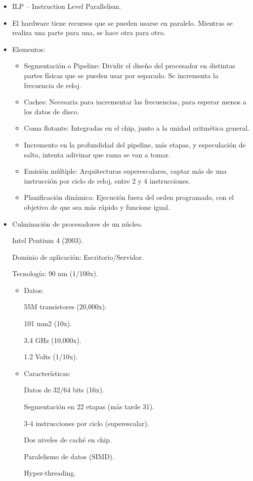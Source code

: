 \documentclass[12pt, twoside, openright]{report} %
\begin{document}
\begin{itemize}
	\item ILP -- Instruction Level Parallelism.
	\item El hardware tiene recursos que se pueden usarse en paralelo.
	      Mientras se realiza una parte para una, se hace otra para otro.
	\item Elementos:

	      \begin{itemize}

		      \item Segmentación o Pipeline: Dividir el diseño del procesador en
		            distintas partes físicas que se pueden usar por separado. Se
		            incrementa la frecuencia de reloj.
		      \item Caches: Necesaria para incrementar las frecuencias, para esperar
		            menos a los datos de disco.
		      \item Coma flotante: Integradas en el chip, junto a la unidad
		            aritmética general.
		      \item Incremento en la profundidad del pipeline, más etapas, y
		            especulación de salto, intenta adivinar que rama se van a tomar.
		      \item Emisión múltiple: Arquitecturas superescalares, captar más de
		            una instrucción por ciclo de reloj, entre 2 y 4 instrucciones.
		      \item Planificación dinámica: Ejecución fuera del orden programado,
		            con el objetivo de que sea más rápido y funcione igual.
	      \end{itemize}
	\item Culminación de procesadores de un núcleo.

	      Intel Pentium 4 (2003).

	      Dominio de aplicación: Escritorio/Servidor.

	      Tecnología: 90 nm (1/100x).
	      \begin{itemize}
		      \item Datos:

		            55M transistores (20,000x).

		            101 mm2 (10x).

		            3.4 GHz (10,000x).

		            1.2 Volts (1/10x).

		      \item Características:

		            Datos de 32/64 bits (16x).

		            Segmentación en 22 etapas (más tarde 31).

		            3-4 instrucciones por ciclo (superescalar).

		            Dos niveles de caché en chip.

		            Paralelismo de datos (SIMD).

		            Hyper-threading.
	      \end{itemize}
\end{itemize}
\end{document}
